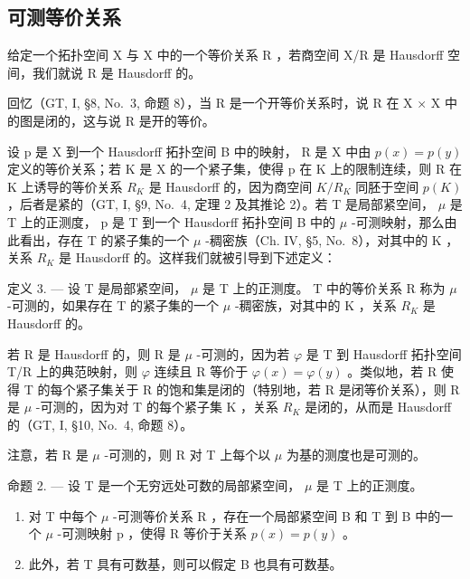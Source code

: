 \subsection{可测等价关系}

给定一个拓扑空间 X 与 X 中的一个等价关系 R ，若商空间 X/R 是 Hausdorff 空间，我们就说 R 是 Hausdorff 的。

回忆（GT, I, §8, No.~3, 命题 8），当 R 是一个开等价关系时，说 R 在 X × X 中的图是闭的，这与说 R 是开的等价。

设 p 是 X 到一个 Hausdorff 拓扑空间 B 中的映射， R 是 X 中由 \(p(x) = p(y)\) 定义的等价关系；若 K 是 X 的一个紧子集，使得 p 在 K 上的限制连续，则 R 在 K 上诱导的等价关系 \(R_{K}\) 是 Hausdorff 的，因为商空间 \(K/R_{K}\) 同胚于空间 \(p(K)\) ，后者是紧的（GT, I, §9, No.~4, 定理 2 及其推论 2）。若 T 是局部紧空间， \(\mu\) 是 T 上的正测度， p 是 T 到一个 Hausdorff 拓扑空间 B 中的 \(\mu\) -可测映射，那么由此看出，存在 T 的紧子集的一个 \(\mu\) -稠密族（Ch. IV, §5, No.~8），对其中的 K ，关系 \(R_{K}\) 是 Hausdorff 的。这样我们就被引导到下述定义：

定义 3. --- 设 T 是局部紧空间， \(\mu\) 是 T 上的正测度。 T 中的等价关系 R 称为 \(\mu\) -可测的，如果存在 T 的紧子集的一个 \(\mu\) -稠密族，对其中的 K ，关系 \(R_{K}\) 是 Hausdorff 的。

若 R 是 Hausdorff 的，则 R 是 \(\mu\) -可测的，因为若 \(\varphi\) 是 T 到 Hausdorff 拓扑空间 T/R 上的典范映射，则 \(\varphi\) 连续且 R 等价于 \(\varphi(x)=\varphi(y)\) 。类似地，若 R 使得 T 的每个紧子集关于 R 的饱和集是闭的（特别地，若 R 是闭等价关系），则 R 是 \(\mu\) -可测的，因为对 T 的每个紧子集 K ，关系 \(R_{K}\) 是闭的，从而是 Hausdorff 的（GT, I, §10, No.~4, 命题 8）。

注意，若 R 是 \(\mu\) -可测的，则 R 对 T 上每个以 \(\mu\) 为基的测度也是可测的。

命题 2. --- 设 T 是一个无穷远处可数的局部紧空间， \(\mu\) 是 T 上的正测度。

\begin{enumerate}
\def\labelenumi{\arabic{enumi})}
\item
  对 T 中每个 \(\mu\) -可测等价关系 R ，存在一个局部紧空间 B 和 T 到 B 中的一个 \(\mu\) -可测映射 p ，使得 R 等价于关系 \(p(x) = p(y)\) 。
\item
  此外，若 T 具有可数基，则可以假定 B 也具有可数基。
\end{enumerate}


